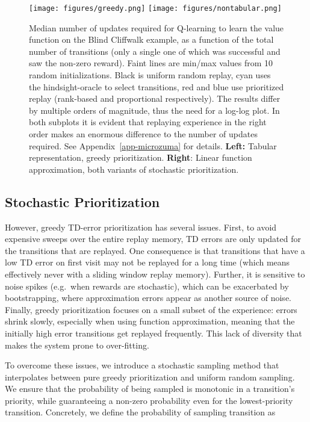\documentclass[a4paper]{article}
\begin{document}
\begin{figure}[tb]
\vspace{-0.5em}
\centerline{
\texttt{[image: figures/greedy.png]}
\hspace{0.05\textwidth}
\texttt{[image: figures/nontabular.png]}
}
\vspace{-0.5em}
\caption{
\label{fig-baseline-oracle}
Median number of updates required for Q-learning to learn the value function on the Blind Cliffwalk example, as a function of the total number of transitions (only a single one of which was successful and saw the non-zero reward). Faint lines are min/max values from 10 random initializations.
Black is uniform random replay, cyan uses the hindsight-oracle to select transitions, red and blue use prioritized replay (rank-based and proportional respectively).
The results differ by multiple orders of magnitude, thus the need for a log-log plot.
In both subplots it is evident that replaying experience in the right order makes an enormous difference to the number of updates required. See Appendix~\ref{app-microzuma} for details.
{\bf Left:} Tabular representation, greedy prioritization. {\bf Right}: Linear function approximation, both variants of stochastic prioritization.
\vspace{-1em}
}
\end{figure}


\subsection{Stochastic Prioritization}


However, greedy TD-error prioritization has several issues.
First, to avoid expensive sweeps over the entire replay memory, TD errors are only updated for the transitions that are replayed. One consequence is that transitions that have a low TD error on first visit may not be replayed for a long time 
(which means effectively never with a sliding window replay memory).
Further, it is sensitive to noise spikes (e.g.\ when rewards are stochastic), 
which can be exacerbated by bootstrapping, where approximation errors appear as another source of noise.
Finally, greedy prioritization focuses on a small subset of the experience: errors shrink slowly, especially when using function approximation, meaning that the initially high error transitions get replayed frequently. This lack of diversity that makes the system prone to over-fitting.

To overcome these issues, we introduce a stochastic sampling method that
interpolates between pure greedy prioritization and uniform random sampling. We ensure that the probability of being sampled is monotonic in a transition's priority, 
while guaranteeing a non-zero probability even for the lowest-priority transition.
Concretely, we define the probability of sampling transition  as
\end{document}

